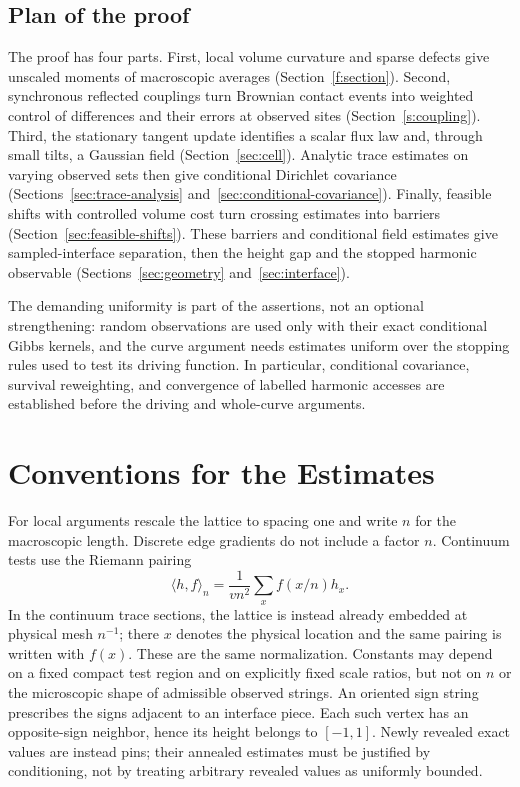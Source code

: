 \documentclass[11pt]{article}
\theoremstyle{definition}
\theoremstyle{remark}
\numberwithin{equation}{section}
\begin{document}
\subsection{Plan of the proof}
The proof has four parts. First, local volume curvature and sparse
defects give unscaled moments of macroscopic averages
(Section~\ref{f:section}). Second, synchronous
reflected couplings turn Brownian contact events into weighted control of
differences and their errors at observed sites
(Section~\ref{s:coupling}). Third, the stationary
tangent update identifies a scalar flux law and, through small tilts, a
Gaussian field (Section~\ref{sec:cell}). Analytic trace estimates on
varying observed sets then give conditional Dirichlet covariance
(Sections~\ref{sec:trace-analysis} and~\ref{sec:conditional-covariance}).
Finally, feasible shifts with controlled volume cost turn crossing
estimates into barriers (Section~\ref{sec:feasible-shifts}). These
barriers and conditional field estimates give sampled-interface separation,
then the height gap and the stopped harmonic observable
(Sections~\ref{sec:geometry} and~\ref{sec:interface}).

The demanding uniformity is part of the assertions, not an optional
strengthening: random observations are used only with their exact conditional
Gibbs kernels, and the curve argument needs estimates uniform over the
stopping rules used to test its driving function. In particular,
conditional covariance, survival reweighting, and convergence of labelled
harmonic accesses are established before the driving and whole-curve arguments.

\section{Conventions for the Estimates}\label{sec:conventions}
For local arguments rescale the lattice to spacing one and write $n$ for
the macroscopic length. Discrete edge gradients do not include a factor
$n$. Continuum tests use the Riemann pairing
\[
\langle h,f\rangle_n=\frac1{vn^2}\sum_x f(x/n)h_x.
\]
In the continuum trace sections, the lattice is instead already embedded
at physical mesh $n^{-1}$; there $x$ denotes the physical location and the
same pairing is written with $f(x)$. These are the same normalization.
Constants may depend on a fixed compact test region and on explicitly fixed
scale ratios, but not on $n$ or the microscopic shape of admissible observed
strings. An oriented sign string prescribes the signs adjacent to an
interface piece. Each such vertex has an opposite-sign neighbor, hence its
height belongs to $[-1,1]$. Newly revealed exact values are instead pins;
their annealed estimates must be justified by conditioning, not by treating
arbitrary revealed values as uniformly bounded.
\end{document}

